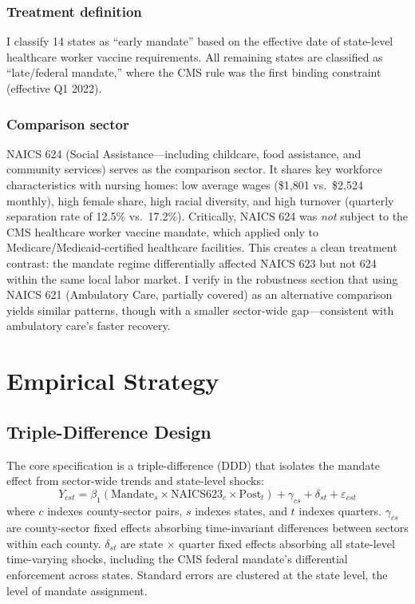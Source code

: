 \documentclass[12pt]{article}
\begin{document}
\subsubsection*{Treatment definition} I classify 14 states as ``early mandate'' based on the effective date of state-level healthcare worker vaccine requirements. All remaining states are classified as ``late/federal mandate,'' where the CMS rule was the first binding constraint (effective Q1 2022).

\subsubsection*{Comparison sector} NAICS 624 (Social Assistance---including childcare, food assistance, and community services) serves as the comparison sector. It shares key workforce characteristics with nursing homes: low average wages (\$1,801 vs.\ \$2,524 monthly), high female share, high racial diversity, and high turnover (quarterly separation rate of 12.5\% vs.\ 17.2\%). Critically, NAICS 624 was \emph{not} subject to the CMS healthcare worker vaccine mandate, which applied only to Medicare/Medicaid-certified healthcare facilities. This creates a clean treatment contrast: the mandate regime differentially affected NAICS 623 but not 624 within the same local labor market. I verify in the robustness section that using NAICS 621 (Ambulatory Care, partially covered) as an alternative comparison yields similar patterns, though with a smaller sector-wide gap---consistent with ambulatory care's faster recovery.



\section{Empirical Strategy}

\subsection{Triple-Difference Design}

The core specification is a triple-difference (DDD) that isolates the mandate effect from sector-wide trends and state-level shocks:
\begin{equation}
\label{eq:ddd}
Y_{cst} = \beta_1 \left(\text{Mandate}_s \times \text{NAICS623}_c \times \text{Post}_t\right) + \gamma_{cs} + \delta_{st} + \varepsilon_{cst}
\end{equation}
where $c$ indexes county-sector pairs, $s$ indexes states, and $t$ indexes quarters. $\gamma_{cs}$ are county-sector fixed effects absorbing time-invariant differences between sectors within each county. $\delta_{st}$ are state $\times$ quarter fixed effects absorbing all state-level time-varying shocks, including the CMS federal mandate's differential enforcement across states. Standard errors are clustered at the state level, the level of mandate assignment.
\end{document}

